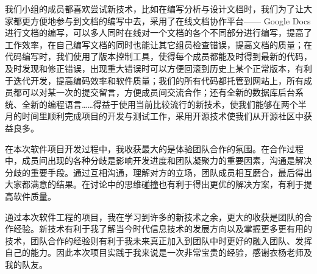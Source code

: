 \begin{itemize}
  \CJKindent 我们小组的成员都喜欢尝试新技术，比如在编写分析与设计文档时，我们为了让大家都更方便地参与到文档的编写中去，采用了在线文档协作平台—— Google Docs进行文档的编写，可以多人同时在线对一个文档的各个不同部分进行编写，提高了工作效率，在自己编写文档的同时也能让其它组员检查错误，提高文档的质量；在代码编写时，我们使用了版本控制工具，使得每个成员都能及时得到最新的代码，及时发现和修正错误，出现重大错误时可以方便回滚到历史上某个正常版本，有利于迭代开发，提高编码效率和软件质量；我们的所有代码都托管到网站上，所有成员都可以对某一次的提交留言，方便成员间交流合作；还有全新的数据库后台系统、全新的编程语言……得益于使用当前比较流行的新技术，使我们能够在两个半月的时间里顺利完成项目的开发与测试工作，采用开源技术使我们从开源社区中获益良多。
  
  \CJKindent 在本次软件项目开发过程中，我收获最大的是体验团队合作的氛围。在合作过程中，成员间出现的各种分歧是影响开发进度和团队凝聚力的重要因素，沟通是解决分歧的重要手段。通过互相沟通，理解对方的立场，团队成员相互磨合，最后得出大家都满意的结果。在讨论中的思维碰撞也有利于得出更优的解决方案，有利于提高软件质量。
  
  \CJKindent 通过本次软件工程的项目，我在学习到许多的新技术之余，更大的收获是团队的合作经验。新技术有利于我了解当今时代信息技术的发展方向以及掌握更多更有用的技术，团队合作的经验则有利于我未来真正加入到团队中时更好的融入团队、发挥自己的能力。因此本次项目实践于我来说是一次非常宝贵的经验，感谢衣杨老师及我的队友。

\end{itemize}
